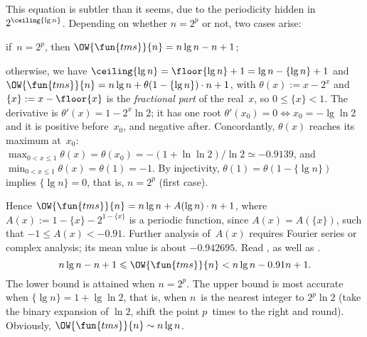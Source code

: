 This equation is subtler than it seems, due to the periodicity hidden
in \(2^{\ceiling{\lg n}}\). Depending on whether \(n = 2^p\) or not,
two cases arise:
\begin{itemize*}

  \item if~\(n=2^p\), then \(\OW{\fun{tms}}{n} = n\lg n - n +
    1\);

  \item otherwise, we have \(\ceiling{\lg n} = \floor{\lg n} + 1 = \lg
    n - \{\lg n\} + 1\) and \(\OW{\fun{tms}}{n} = n\lg n + \theta(1 -
    \{\lg n\}) \cdot n + 1\), with \(\theta(x) := x - 2^x\) and
    \(\{x\} := x - \floor{x}\) is the \emph{fractional
    part} of the real~\(x\), so \(0
    \leqslant \{x\} < 1\). The derivative is \(\theta'(x) = 1 - 2^x\ln
    2\); it has one root \(\theta'(x_0) = 0 \Leftrightarrow x_0 =
    -\lg\ln 2\) and it is positive before~\(x_0\), and negative
    after. Concordantly, \(\theta(x)\) reaches its maximum at~\(x_0\):
    \(\max_{0<x\leqslant 1}\theta(x) = \theta(x_0) =
    -(1+\ln\ln{2})/\!\ln{2} \simeq -0.9139\), and \(\min_{0<x\leqslant
      1}\theta(x) = \theta(1) = -1\). By injectivity, \(\theta(1) =
    \theta(1-\{\lg n\})\) implies \(\{\lg n\} = 0\), that is,
    \(n=2^p\) (first case).
\end{itemize*}
Hence \(\OW{\fun{tms}}{n} = n\lg n + A(\lg n) \cdot n + 1\), where
\(A(x) := 1 - \{x\} - 2^{1 - \{x\}}\) is a periodic function, since
\(A(x) = A(\{x\})\), such that \(-1 \leqslant A(x) < -0.91\). Further
analysis of~\(A(x)\) requires Fourier series or complex analysis; its
mean value is about \(-0.942695\). Read \cite{FlajoletGolin_1994}, as
well as \cite{PannyProdinger_1995}.
\begin{equation}
n\lg n - n + 1 \leqslant \OW{\fun{tms}}{n} <
n\lg n - 0.91 n + 1.\label{ineq:OWtms}
\end{equation}
The lower bound is attained when \(n=2^p\). The upper bound is most
accurate when \(\{\lg n\} = 1 + \lg\ln 2\), that is, when \(n\)~is the
nearest integer to \(2^p\ln 2\) (take the binary expansion of \(\ln
2\), shift the point \(p\)~times to the right and round). Obviously,
\(\OW{\fun{tms}}{n} \sim n\lg n\).


